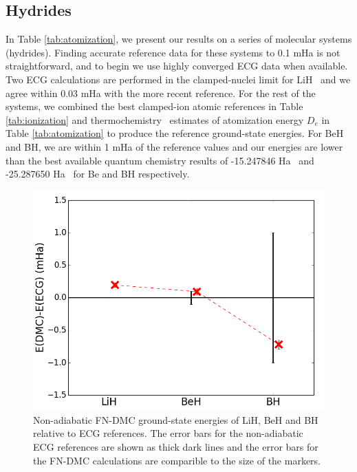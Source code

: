 \documentclass[pra,superscriptaddress,groupedaddress,twocolumn]{revtex4-1}
\begin{document}
\subsection{Hydrides}


In Table \ref{tab:atomization}, we present our results on a series of molecular systems (hydrides). Finding accurate reference data for these systems to 0.1 mHa is not straightforward, and to begin we use highly converged ECG data when available. Two ECG calculations are performed in the clamped-nuclei limit for LiH~\cite{Cencek_LiH,Adamowicz_LiH} and we agree within 0.03 mHa with the more recent reference. For the rest of the systems, we combined the best clamped-ion atomic references in Table \ref{tab:ionization} and thermochemistry~\cite{Feller_Corrections} estimates of atomization energy $D_e$ in Table \ref{tab:atomization} to produce the reference ground-state energies. For BeH and BH, we are within 1 mHa of the reference values and our energies are lower than the best available quantum chemistry results of -15.247846 Ha~\cite{Koput_BeH} and -25.287650 Ha~\cite{Miliordos_BH} for Be and BH respectively. 

\begin{figure}[h]
\centering
\includegraphics[scale=.37]{Figures/dia-ECG}
\caption{Non-adiabatic FN-DMC ground-state energies of LiH, BeH and BH relative to ECG references. The error bars for the non-adiabatic ECG references are shown as thick dark lines and the error bars for the FN-DMC calculations are comparible to the size of the markers. \label{fig:dia-ECG}}
\end{figure}
\end{document}
